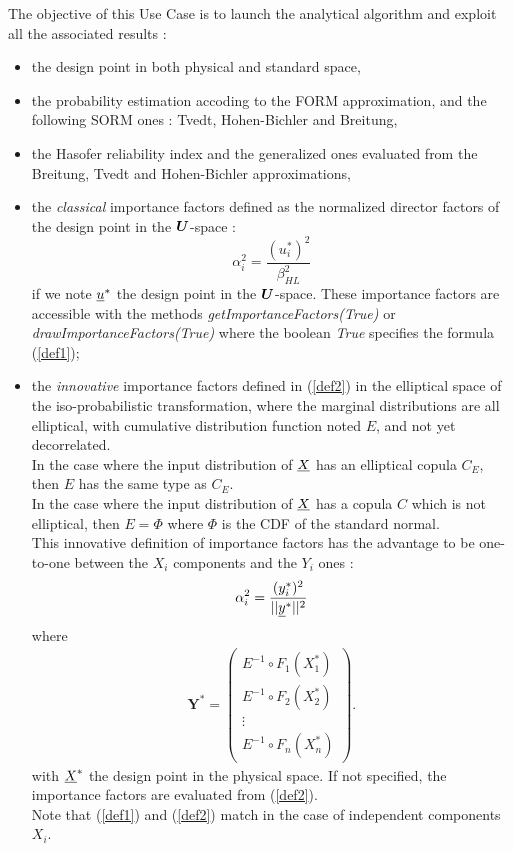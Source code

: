 The objective of this Use Case is to launch the analytical algorithm and exploit all the associated results :
\begin{itemize}
\item the design point in both physical and standard space,
\item the probability estimation accoding to the FORM approximation, and the following SORM ones : Tvedt, Hohen-Bichler and Breitung,
\item the Hasofer reliability index and the generalized ones evaluated from the Breitung, Tvedt and Hohen-Bichler approximations,
\item the \emph{classical} importance factors defined as the normalized director factors of the design point in the ${\boldsymbol{U}}$-space  :
  \begin{equation}\label{def1}
    \alpha_i^2 = \displaystyle \frac{(u_i^{*})^2}{\beta_{HL}^2}
  \end{equation}
  if we note ${\underline{u}}^*$ the design point in the ${\boldsymbol{U}}$-space. These importance factors are accessible with the methods \emph{getImportanceFactors(True)} or  \emph{drawImportanceFactors(True)} where the boolean \textit{True} specifies the formula (\ref{def1});
\item the \emph{innovative} importance factors defined in (\ref{def2}) in the elliptical space of the iso-probabilistic transformation, where the marginal distributions are all elliptical, with cumulative distribution function noted $E$, and not yet decorrelated.\\
  In the case where the input distribution of ${\underline{X}}$ has an elliptical copula $C_E$, then $E$ has the same type as  $C_E$.\\
  In the case where the input distribution of ${\underline{X}}$ has a copula $C$ which is not elliptical, then  $E=\Phi$ where $\Phi$ is the CDF of the standard normal.\\
  This innovative definition of importance factors has the advantage to be one-to-one between the $X_i$ components and the $Y_i$ ones :
  \begin{equation}\label{def2}
    \alpha_i^2 = \displaystyle \frac{(y_i^{*})^2}{||{\underline{y}}^{*}||^2}
  \end{equation}
  where
  \begin{eqnarray}
    \boldsymbol{Y}^* =  \left(
    \begin{array}{c}
      E^{-1}\circ F_1(X_1^*) \\
      E^{-1}\circ F_2(X_2^*) \\
      \vdots \\
      E^{-1}\circ F_n(X_n^*)
    \end{array}
    \right).\label{varY10}
  \end{eqnarray}
  with ${\underline{X}}^*$ the design point in the physical space. If not specified, the importance factors are evaluated from (\ref{def2}).\\
  Note that (\ref{def1}) and (\ref{def2}) match in the case of independent components $X_i$.


\end{itemize}
